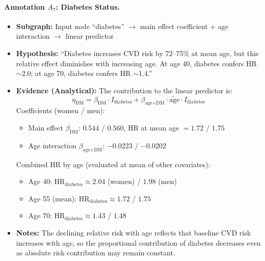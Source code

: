 \documentclass{article}
\begin{document}
\paragraph{Annotation $A_7$: Diabetes Status.}
\begin{itemize}
    \item \textbf{Subgraph:} Input node ``diabetes'' $\rightarrow$ main effect coefficient + age interaction $\rightarrow$ linear predictor
    \item \textbf{Hypothesis:} ``Diabetes increases CVD risk by 72--75\% at mean age, but this relative effect diminishes with increasing age. At age 40, diabetes confers HR $\sim$2.0; at age 70, diabetes confers HR $\sim$1.4.''
    \item \textbf{Evidence (Analytical):} The contribution to the linear predictor is:
    \[
    \eta_{\text{DM}} = \beta_{\text{DM}} \cdot I_{\text{diabetes}} + \beta_{\text{age} \times \text{DM}} \cdot \tilde{\text{age}} \cdot I_{\text{diabetes}}
    \]
    Coefficients (women / men):
    \begin{itemize}
        \item Main effect $\beta_{\text{DM}}$: $0.544$ / $0.560$, HR at mean age $= 1.72$ / $1.75$
        \item Age interaction $\beta_{\text{age} \times \text{DM}}$: $-0.0223$ / $-0.0202$
    \end{itemize}
    Combined HR by age (evaluated at mean of other covariates):
    \begin{itemize}
        \item Age 40: HR$_{\text{diabetes}} \approx 2.04$ (women) / $1.98$ (men)
        \item Age 55 (mean): HR$_{\text{diabetes}} \approx 1.72$ / $1.75$
        \item Age 70: HR$_{\text{diabetes}} \approx 1.43$ / $1.48$
    \end{itemize}
    \item \textbf{Notes:} The declining relative risk with age reflects that baseline CVD risk increases with age, so the proportional contribution of diabetes decreases even as absolute risk contribution may remain constant.
\end{itemize}
\end{document}
